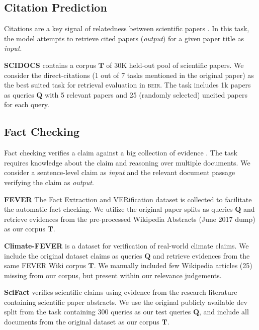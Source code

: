 \documentclass{article}
\newcommand{\custo}[1]{\textsc{\normalsize #1}}
\newcommand{\beir}{\custo{beir}\xspace}
\begin{document}
\vspace{-2mm}
\subsection{Citation Prediction}
\vspace{-1mm}
Citations are a key signal of relatedness between scientific papers \cite{cohan-etal-2020-specter}. In this task, the model attempts to retrieve cited papers (\textit{output}) for a given paper title as \textit{input}.

\textbf{SCIDOCS} \cite{cohan-etal-2020-specter} contains a corpus $\mathbf{T}$ of 30K held-out pool of scientific papers. We consider the direct-citations (1 out of 7 tasks mentioned in the original paper) as the best suited task for retrieval evaluation in \beir. The task includes 1k papers as queries $\mathbf{Q}$ with 5 relevant papers and 25 (randomly selected) uncited papers for each query. 

\vspace{-1mm}
\subsection{Fact Checking}
\vspace{-1mm}
Fact checking verifies a claim against a big collection of evidence \cite{thorne-etal-2018-fever}. The task requires knowledge about the claim and reasoning over multiple documents. We consider a sentence-level claim as \textit{input} and the relevant document passage verifying the claim as \textit{output}.

\textbf{FEVER} \cite{thorne-etal-2018-fever} The Fact Extraction and VERification dataset is collected to facilitate the automatic fact checking. We utilize the original paper splits as queries $\mathbf{Q}$ and retrieve evidences from the pre-processed Wikipedia Abstracts (June 2017 dump) as our corpus $\mathbf{T}$.

\textbf{Climate-FEVER} \cite{diggelmann2020climatefever} is a dataset for verification of real-world climate claims. We include the original dataset claims as queries $\mathbf{Q}$ and retrieve evidences from the same FEVER Wiki corpus $\mathbf{T}$. We manually included few Wikipedia articles (25) missing from our corpus, but present within our relevance judgements.

\textbf{SciFact} \cite{wadden-etal-2020-fact} verifies scientific claims using evidence from the research literature containing scientific paper abstracts. We use the original publicly available dev split from the task containing 300 queries as our test queries $\mathbf{Q}$, and include all documents from the original dataset as our corpus $\mathbf{T}$.
\end{document}
